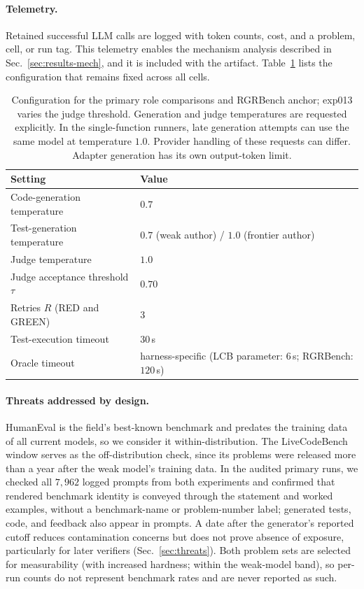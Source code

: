 \documentclass{article}
\begin{document}
\paragraph{Telemetry.} Retained successful LLM calls are logged with token counts, cost, and a problem, cell,
or run tag. This telemetry enables the mechanism analysis described in
Sec.~\ref{sec:results-mech}, and it is included with the artifact. Table~\ref{tab:config} lists the
configuration that remains fixed across all cells.

\begin{table}[t]
\centering
\small
\caption{Configuration for the primary role comparisons and RGRBench anchor; exp013 varies
the judge threshold.
Generation and judge temperatures are requested explicitly. In the single-function
runners, late generation attempts can use the same model at temperature $1.0$. Provider
handling of these requests can differ. Adapter generation has its own output-token limit.}
\label{tab:config}
\begin{tabular}{ll}
\toprule
Setting & Value \\
\midrule
Code-generation temperature & $0.7$ \\
Test-generation temperature & $0.7$ (weak author) / $1.0$ (frontier author) \\
Judge temperature & $1.0$ \\
Judge acceptance threshold $\tau$ & $0.70$ \\
Retries $R$ (RED and GREEN) & $3$ \\
Test-execution timeout & $30$\,s \\
Oracle timeout & harness-specific (LCB parameter: $6$\,s; RGRBench: $120$\,s) \\
\bottomrule
\end{tabular}
\end{table}

\paragraph{Threats addressed by design.} HumanEval is the field's best-known benchmark and
predates the training data of all current models, so we consider it within-distribution. The
LiveCodeBench window serves as the off-distribution check, since its problems were released more
than a year after the weak model's training data. In the audited primary runs, we checked all $7{,}962$ logged prompts from both experiments and confirmed that rendered
benchmark identity is conveyed through the statement and worked examples, without a
benchmark-name or problem-number label; generated tests, code, and feedback also appear in prompts. A date after the generator's reported cutoff reduces contamination concerns but does not
prove absence of exposure, particularly for later verifiers (Sec.~\ref{sec:threats}). Both problem sets are selected for measurability (with increased hardness; within the
weak-model band), so per-run counts do not represent benchmark rates and are never reported as
such.
\end{document}
